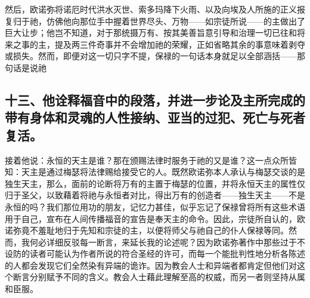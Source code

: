 然后，欧诺弥将诺厄时代洪水灭世、索多玛降下火雨、以及向埃及人所施的正义报复归于祂，仿佛他向那位手中握着世界尽头、万物——如宗徒所说——的主做出了巨大让步；他岂不知道，对于那统摄万有、按其美善旨意引导和治理一切已往和将来之事的主，提及两三件奇事并不会增加祂的荣耀，正如省略其余的事意味着剥夺或损失。然而，即便对这一切只字不提，保禄的一句话本身就足以全部涵括——那句话是说祂\par


\subsection{十三、他诠释福音中的段落，并进一步论及主所完成的带有身体和灵魂的人性接纳、亚当的过犯、死亡与死者复活。}

接着他说：永恒的天主是谁？那在颁赐法律时服务于祂的又是谁？这一点众所皆知：天主是通过梅瑟将法律赐给接受它的人。既然欧诺弥本人承认与梅瑟交谈的是独生天主，那么，面前的论断将万有的主置于梅瑟的位置，并将永恒天主的属性仅归于圣父，以致藉着将祂与永恒者对比，得出万有的创造者——独生天主——不是永恒的吗？我们那位用功的朋友，记忆力甚佳，似乎忘记了保禄曾将所有这些术语用于自己，宣布在人间传播福音的宣告是奉天主的命令。因此，宗徒所自认的，欧诺弥竟不羞耻地归于先知和宗徒的主，以便将师父与祂自己的仆人保禄等同。然而，我何必详细反驳每一断言，来延长我的论述呢？因为欧诺弥著作中那些过于不设防的读者可能认为作者所说的符合圣经的许可，而每一个能批判性地分析各陈述的人都会发现它们全然染有异端的诡诈。因为教会人士和异端者都肯定但他们对这个断言分别赋予不同的含义。教会人士藉此理解至高的权威，而另一者则坚持从属和臣服。\par

